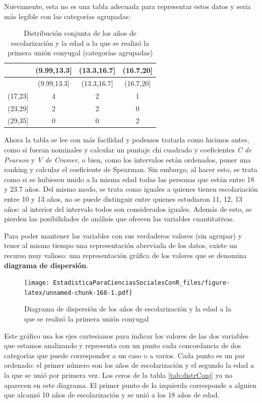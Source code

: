 \documentclass[]{book}
\begin{document}
Nuevamente, esta no es una tabla adecuada para representar estos datos y sería más legible con las categorías agrupadas:

\begin{longtable}[]{@{}lccc@{}}
\caption{\label{tab:unnamed-chunk-167}Distribución conjunta de los años de escolarización y la edad a la que se realizó la primera unión conyugal (categorías agrupadas)}\tabularnewline
\toprule
& (9.99,13.3{]} & (13.3,16.7{]} & (16.7,20{]}\tabularnewline
\midrule
\endfirsthead
\toprule
& (9.99,13.3{]} & (13.3,16.7{]} & (16.7,20{]}\tabularnewline
\midrule
\endhead
(17,23{]} & 4 & 2 & 1\tabularnewline
(23,29{]} & 2 & 2 & 0\tabularnewline
(29,35{]} & 0 & 0 & 2\tabularnewline
\bottomrule
\end{longtable}

Ahora la tabla se lee con más facilidad y podemos tratarla como hicimos antes, como si fueran nominales y calcular un puntaje chi cuadrado y coeficientes \emph{C de Pearson} y \emph{V de Cramer}, o bien, como los intervalos están ordenados, poner una ranking y calcular el coeficiente de Spearman. Sin embargo, al hacer esto, se trata como si se hubiesen unido a la misma edad todas las personas que están entre 18 y 23.7 años. Del mismo modo, se trata como iguales a quienes tienen escolariación entre 10 y 13 años, no se puede distinguir entre quienes estudiaron 11, 12, 13 años: al interior del intervalo todos son considerados iguales. Además de esto, se pierden las posibilidades de análisis que ofrecen las variables cuantitativas.

Para poder mantener las variables con sus verdaderos valores (sin
agrupar) y tener al mismo tiempo una representación abreviada de los
datos, existe un recurso muy valioso: una representación gráfica de los valores que se denomina \textbf{diagrama de dispersión}.

\begin{figure}
\centering
\texttt{[image: EstadisticaParaCienciasSocialesConR\_files/figure-latex/unnamed-chunk-168-1.pdf]}
\caption{\label{fig:unnamed-chunk-168}Diagrama de dispersión de los años de escolarización y la edad a la que se realizó la primera unión conyugal}
\end{figure}

Este gráfico usa los ejes cartesianos para indicar los valores de las
dos variables que estamos analizando y representa con un punto cada
concordancia de dos categorías que puede corresponder a un caso o a
varios. Cada punto es un par ordenado: el primer número son los años de escolarización y el segundo la edad a la que se unió por primera vez. Los ceros de la tabla \ref{tab:distrConj} ya no aparecen en este diagrama. El primer punto de la izquierda corresponde a alguien que alcanzó 10 años de escolarización y se unió a los 18 años de edad.
\end{document}
